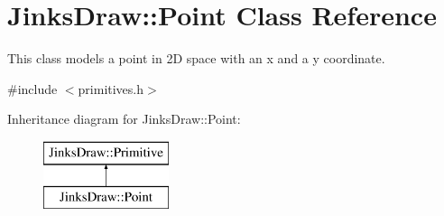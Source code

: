 \hypertarget{class_jinks_draw_1_1_point}{}\section{Jinks\+Draw\+:\+:Point Class Reference}
\label{class_jinks_draw_1_1_point}


This class models a point in 2D space with an x and a y coordinate.  




{\ttfamily \#include $<$primitives.\+h$>$}

Inheritance diagram for Jinks\+Draw\+:\+:Point\+:\begin{figure}[H]
\begin{center}
\leavevmode
\includegraphics[height=2.000000cm]{class_jinks_draw_1_1_point}
\end{center}
\end{figure}
